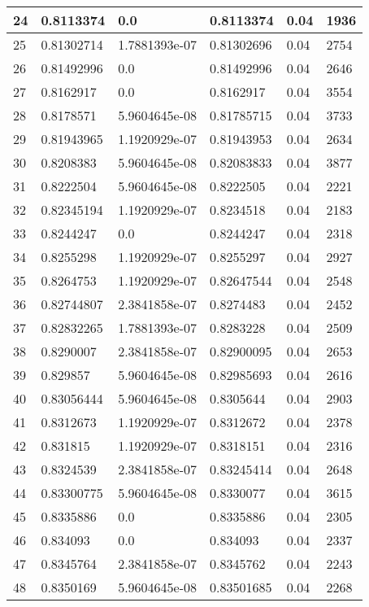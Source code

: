\begin{longtable}{|l|l|l|l|l|l|}
24 & 0.8113374 & 0.0 & 0.8113374 & 0.04 & 1936 \\ \hline 
25 & 0.81302714 & 1.7881393e-07 & 0.81302696 & 0.04 & 2754 \\ \hline 
26 & 0.81492996 & 0.0 & 0.81492996 & 0.04 & 2646 \\ \hline 
27 & 0.8162917 & 0.0 & 0.8162917 & 0.04 & 3554 \\ \hline 
28 & 0.8178571 & 5.9604645e-08 & 0.81785715 & 0.04 & 3733 \\ \hline 
29 & 0.81943965 & 1.1920929e-07 & 0.81943953 & 0.04 & 2634 \\ \hline 
30 & 0.8208383 & 5.9604645e-08 & 0.82083833 & 0.04 & 3877 \\ \hline 
31 & 0.8222504 & 5.9604645e-08 & 0.8222505 & 0.04 & 2221 \\ \hline 
32 & 0.82345194 & 1.1920929e-07 & 0.8234518 & 0.04 & 2183 \\ \hline 
33 & 0.8244247 & 0.0 & 0.8244247 & 0.04 & 2318 \\ \hline 
34 & 0.8255298 & 1.1920929e-07 & 0.8255297 & 0.04 & 2927 \\ \hline 
35 & 0.8264753 & 1.1920929e-07 & 0.82647544 & 0.04 & 2548 \\ \hline 
36 & 0.82744807 & 2.3841858e-07 & 0.8274483 & 0.04 & 2452 \\ \hline 
37 & 0.82832265 & 1.7881393e-07 & 0.8283228 & 0.04 & 2509 \\ \hline 
38 & 0.8290007 & 2.3841858e-07 & 0.82900095 & 0.04 & 2653 \\ \hline 
39 & 0.829857 & 5.9604645e-08 & 0.82985693 & 0.04 & 2616 \\ \hline 
40 & 0.83056444 & 5.9604645e-08 & 0.8305644 & 0.04 & 2903 \\ \hline 
41 & 0.8312673 & 1.1920929e-07 & 0.8312672 & 0.04 & 2378 \\ \hline 
42 & 0.831815 & 1.1920929e-07 & 0.8318151 & 0.04 & 2316 \\ \hline 
43 & 0.8324539 & 2.3841858e-07 & 0.83245414 & 0.04 & 2648 \\ \hline 
44 & 0.83300775 & 5.9604645e-08 & 0.8330077 & 0.04 & 3615 \\ \hline 
45 & 0.8335886 & 0.0 & 0.8335886 & 0.04 & 2305 \\ \hline 
46 & 0.834093 & 0.0 & 0.834093 & 0.04 & 2337 \\ \hline 
47 & 0.8345764 & 2.3841858e-07 & 0.8345762 & 0.04 & 2243 \\ \hline 
48 & 0.8350169 & 5.9604645e-08 & 0.83501685 & 0.04 & 2268 \\ \hline 

\end{longtable}
